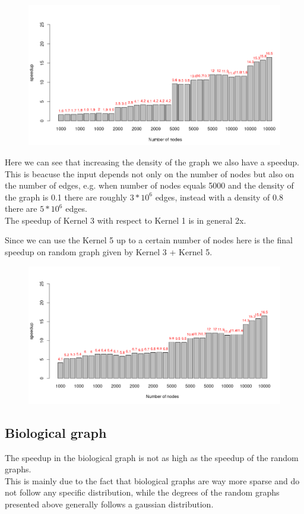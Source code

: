 \documentclass[a4paper]{article}
\begin{document}
\begin{figure}[H]
    \centering
    \includegraphics[width=\textwidth]{img/2020-07-12-20:56:05.png}
\end{figure}
Here we can see that increasing the density of the graph we also have a
speedup.\\
This is beacuse the input depends not only on the number of nodes but also on
the number of edges, e.g. when number of nodes equals 5000 and the density of the graph is 0.1 there are
roughly $3*10^6$ edges, instead with a density of 0.8 there are $5*10^6$
edges.\\
The speedup of Kernel 3 with respect to Kernel 1 is in general 2x.

Since we can use the Kernel 5 up to a certain number of nodes here is the final
speedup on random graph given by Kernel 3 + Kernel 5.

\begin{figure}[H]
    \centering
    \includegraphics[width=\textwidth]{img/2020-07-12-21:07:10.png}
\end{figure}


\newpage
\subsection{Biological graph}
The speedup in the biological graph is not as high as the speedup of the random
graphs.\\
This is mainly due to the fact that biological graphs are way more sparse and do
not follow any specific distribution, while the degrees of the random graphs
presented above generally follows a gaussian distribution.
\end{document}
